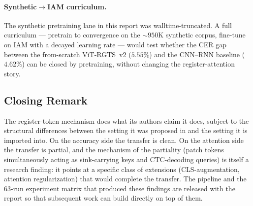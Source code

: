 \paragraph{Synthetic$\to$IAM curriculum.}
The synthetic pretraining lane in this report was walltime-truncated. A full curriculum --- pretrain to convergence on the ${\sim}950$K synthetic corpus, fine-tune on IAM with a decayed learning rate --- would test whether the CER gap between the from-scratch ViT-RGTS~v2 ($5.55\%$) and the CNN--RNN baseline ($4.62\%$) can be closed by pretraining, without changing the register-attention story.

\subsection{Closing Remark}

The register-token mechanism does what its authors claim it does, subject to the structural differences between the setting it was proposed in and the setting it is imported into. On the accuracy side the transfer is clean. On the attention side the transfer is partial, and the mechanism of the partiality (patch tokens simultaneously acting as sink-carrying keys and CTC-decoding queries) is itself a research finding: it points at a specific class of extensions (CLS-augmentation, attention regularization) that would complete the transfer. The pipeline and the $63$-run experiment matrix that produced these findings are released with the report so that subsequent work can build directly on top of them.
